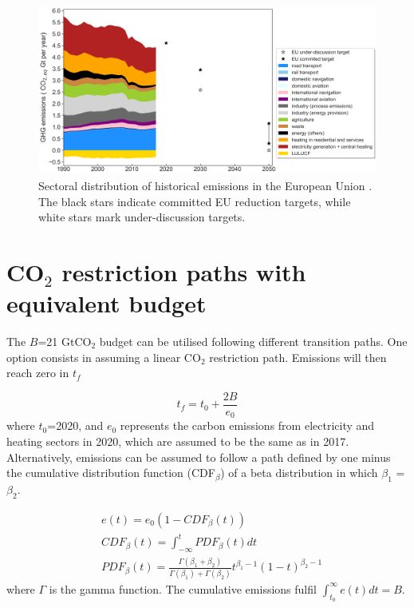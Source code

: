 \documentclass[3p]{elsarticle} %
\begin{document}
\begin{figure}[!h]
\centering
\includegraphics[width=\textwidth]{figures/historical_sectoral_emissions.png}
\caption{Sectoral distribution of historical emissions in the European Union \cite{UNFCCC_inventory}. The black stars indicate committed EU reduction targets, while white stars mark under-discussion targets.} \label{fig_historical_emissions} 
\end{figure}

\FloatBarrier

\section{CO$_2$ restriction paths with equivalent budget}

The $B$=21 GtCO$_2$ budget can be utilised following different transition paths. One option consists in assuming a linear CO$_2$ restriction path. Emissions will then reach zero in $t_f$

\begin{equation}
	t_f=t_0+\frac{2B}{e_0}
\end{equation}
where $t_0$=2020, and $e_0$ represents the carbon emissions from electricity and heating sectors in 2020, which are assumed to be the same as in 2017. \\

Alternatively, emissions can be assumed to follow a path defined by one minus the cumulative distribution function (CDF$_\beta$) of a beta distribution in which $\beta_1$ = $\beta_2$. 

\begin{equation}
\begin{aligned}
&	e (t) = e_0(1- CDF_{\beta}(t)) \\
&	CDF_{\beta} (t) =\int_{-\infty}^{t} PDF_{\beta}(t) dt \\
&	PDF_{\beta} (t) =  \frac{\Gamma(\beta_1+\beta_2)}{\Gamma(\beta_1)+\Gamma(\beta_2)} t^{\beta_1-1} (1-t)^{\beta_2-1}
\end{aligned}
\end{equation}
where $\Gamma$ is the gamma function. The cumulative emissions fulfil $\int_{t_0}^{\infty} e(t) dt =B$. \\
\end{document}
